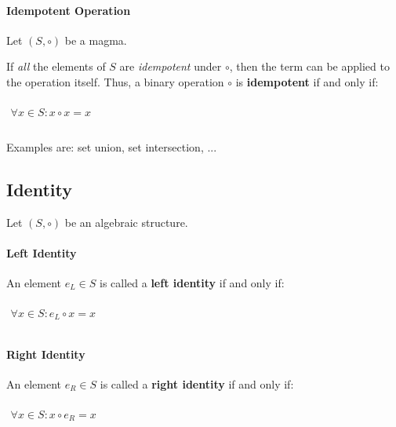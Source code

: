 \paragraph{Idempotent Operation}
Let $(S, \circ)$ be a magma.


If \textit{all} the elements of $S$ are \textit{idempotent} under
$\circ$, then the term can be applied to the operation itself. Thus, a
binary operation $\circ$ is \textbf{idempotent} if and only if:

\begin{math}
  \begin{array}{c}
    \\
    \forall x \in S: x \circ x = x\\
    \\
  \end{array}
\end{math}

Examples are: set union, set intersection, ...



\subsection{Identity}
\label{sec:identity}

Let $(S, \circ)$ be an algebraic structure.


\paragraph{Left Identity}
An element $e_L \in S$ is called a \textbf{left identity} if and only
if:

\begin{math}
  \begin{array}{c}
    \\
    \forall x \in S: e_L \circ x = x\\
    \\
  \end{array}
\end{math}

\paragraph{Right Identity}
An element $e_R \in S$ is called a \textbf{right identity} if and only
if:

\begin{math}
  \begin{array}{c}
    \\
    \forall x \in S: x \circ e_R = x\\
    \\
  \end{array}
\end{math}


